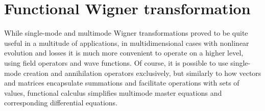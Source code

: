 \chapter{Functional Wigner transformation}
\label{cha:wigner}

While single-mode and multimode Wigner transformations proved to be quite useful in a multitude of applications, in multidimensional cases with nonlinear evolution and losses it is much more convenient to operate on a higher level, using field operators and wave functions.
Of course, it is possible to use single-mode creation and annihilation operators exclusively, but similarly to how vectors and matrices encapsulate summations and facilitate operations with sets of values, functional calculus simplifies multimode master equations and corresponding differential equations.




